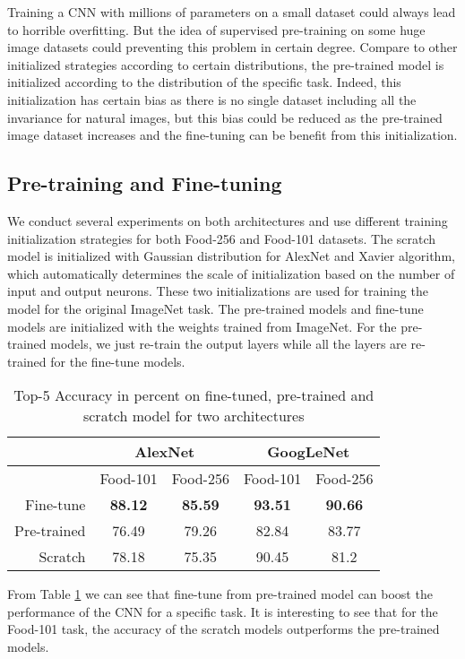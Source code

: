 ﻿Training a CNN with millions of parameters on a small dataset could always lead to horrible overfitting. But the idea of supervised pre-training on some huge image datasets could preventing this problem in certain degree. Compare to other initialized strategies according to certain distributions, the pre-trained model is initialized according to the distribution of the specific task. Indeed, this initialization has certain bias as there is no single dataset including all the invariance for natural images\cite{agrawal2014analyzing}, but this bias could be reduced as the pre-trained image dataset increases and the fine-tuning can be benefit from this initialization.
\subsection{Pre-training and Fine-tuning}
We conduct several experiments on both architectures and use different training initialization strategies for both Food-256 and Food-101 datasets. The scratch model is initialized with Gaussian distribution for AlexNet and Xavier algorithm\cite{glorot2010understanding}, which automatically determines the scale of initialization based on the number of input and output neurons. These two initializations are used for training the model for the original ImageNet task. The pre-trained models and fine-tune models are initialized with the weights trained from ImageNet. For the pre-trained models, we just re-train the output layers while all the layers are re-trained for the fine-tune models.
\begin{table}[htbp]
  \centering
  \caption{Top-5 Accuracy in percent on fine-tuned, pre-trained and scratch model for two architectures}
    \begin{tabular}{r|cc|cc}
    \toprule
          & \multicolumn{2}{c|}{AlexNet} & \multicolumn{2}{c}{GoogLeNet} \\    \midrule
     & Food-101   & Food-256   & Food-101   & Food-256 \\
    Fine-tune & \textbf{88.12} & \textbf{85.59} & \textbf{93.51} & \textbf{90.66} \\
    Pre-trained &76.49	&79.26&	82.84	&83.77\\
    Scratch & 78.18 & 75.35 & 90.45 & 81.2 \\
    \bottomrule
    \end{tabular}%
  \label{tab:ft}%
\end{table}%

From Table \ref{tab:ft} we can see that fine-tune from pre-trained model can boost the performance of the CNN for a specific task. It is interesting to see that for the Food-101 task, the accuracy of  the scratch models outperforms the pre-trained models.

